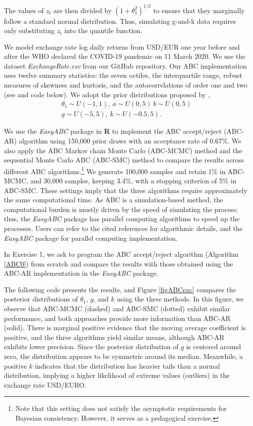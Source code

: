 The values of \(z_t\) are then divided by \((1+\theta_1^2)^{1/2}\) to ensure that they marginally follow a standard normal distribution. Thus, simulating g-and-k data requires only substituting \(z_t\) into the quantile function.  

We model exchange rate log daily returns from USD/EUR one year before and after the WHO declared the COVID-19 pandemic on 11 March 2020. We use the dataset \textit{ExchangeRate.csv} from our GitHub repository. Our ABC implementation uses twelve summary statistics: the seven octiles, the interquartile range, robust measures of skewness and kurtosis, and the autocorrelations of order one and two (see \cite{drovandi2011likelihood} and code below). We adopt the prior distributions proposed by \cite{ramirez2024testing}, 
\begin{align*}
	\theta_1\sim U(-1,1), \ a\sim U(0,5) \ b\sim U(0,5)\\
	g\sim U(-5,5), \ k\sim U(-0.5, 5).
\end{align*}

We use the \textit{EasyABC} package in \textbf{R} to implement the ABC accept/reject (ABC-AR) algorithm using 150,000 prior draws with an acceptance rate of 0.67\%. We also apply the ABC Markov chain Monte Carlo (ABC-MCMC) method \cite{marjoram2003markov} and the sequential Monte Carlo ABC (ABC-SMC) method \cite{lenormand2013adaptive} to compare the results across different ABC algorithms.\footnote{Note that this setting does not satisfy the asymptotic requirements for Bayesian consistency. However, it serves as a pedagogical exercise.} We generate 100,000 samples and retain 1\% in ABC-MCMC, and 30,000 samples, keeping 3.4\%, with a stopping criterion of 5\% in ABC-SMC. These settings imply that the three algorithms require approximately the same computational time. As ABC is a simulation-based method, the computational burden is mostly driven by the speed of simulating the process; thus, the \textit{EasyABC} package has parallel computing algorithms to speed up the processes. Users can refer to the cited references for algorithmic details, and the \textit{EasyABC} package for parallel computing implementation. 

In Exercise 1, we ask to program the ABC accept/reject algorithm (Algorithm \ref{ABC0}) from scratch and compare the results with those obtained using the ABC-AR implementation in the \textit{EasyABC} package.

The following code presents the results, and Figure \ref{figABCexc} compares the posterior distributions of $\theta_1$, $g$, and $k$ using the three methods. In this figure, we observe that ABC-MCMC (dashed) and ABC-SMC (dotted) exhibit similar performance, and both approaches provide more information than ABC-AR (solid). There is marginal positive evidence that the moving average coefficient is positive, and the three algorithms yield similar means, although ABC-AR exhibits lower precision. Since the posterior distribution of $g$ is centered around zero, the distribution appears to be symmetric around its median. Meanwhile, a positive $k$ indicates that the distribution has heavier tails than a normal distribution, implying a higher likelihood of extreme values (outliers) in the exchange rate USD/EURO.

